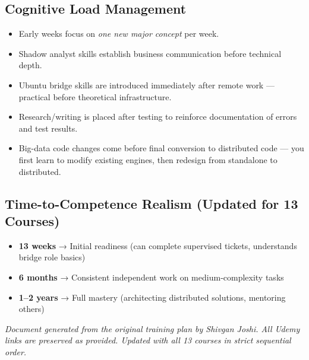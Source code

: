 \documentclass[12pt]{article}
\begin{document}
	\subsection*{Cognitive Load Management}
	\begin{itemize}
		\item Early weeks focus on \emph{one new major concept} per week.
		\item Shadow analyst skills establish business communication before technical depth.
		\item Ubuntu bridge skills are introduced immediately after remote work — practical before theoretical infrastructure.
		\item Research/writing is placed after testing to reinforce documentation of errors and test results.
		\item Big-data code changes come before final conversion to distributed code — you first learn to modify existing engines, then redesign from standalone to distributed.
	\end{itemize}
	
	\subsection*{Time-to-Competence Realism (Updated for 13 Courses)}
	\begin{itemize}
		\item \textbf{13 weeks} → Initial readiness (can complete supervised tickets, understands bridge role basics)
		\item \textbf{6 months} → Consistent independent work on medium‑complexity tasks
		\item \textbf{1–2 years} → Full mastery (architecting distributed solutions, mentoring others)
	\end{itemize}
	
	\vspace{1cm}
	\noindent\textit{Document generated from the original training plan by Shivgan Joshi. All Udemy links are preserved as provided. Updated with all 13 courses in strict sequential order.}
	
\end{document}
